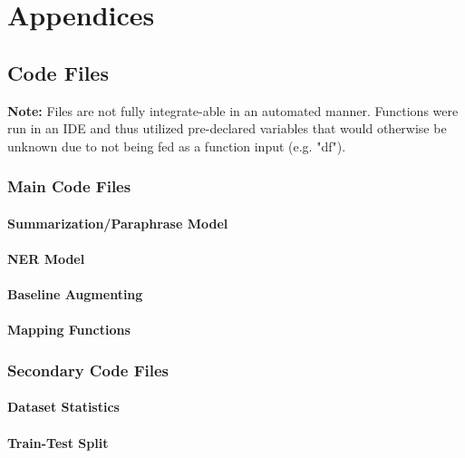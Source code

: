\documentclass[12pt]{report}
\begin{document}
\chapter{Appendices} %
    \section{Code Files}
    \textbf{Note:} Files are not fully integrate-able in an automated manner. Functions were run in an IDE and thus utilized pre-declared variables that would otherwise be unknown due to not being fed as a function input (e.g. "df").
        \subsection{Main Code Files}
            \subsubsection{Summarization/Paraphrase Model}
                
                \newpage
            \subsubsection{NER Model}
                
                \newpage
            \subsubsection{Baseline Augmenting}
                
                \newpage
            \subsubsection{Mapping Functions}
                
                \newpage
            
        \subsection{Secondary Code Files}
            \subsubsection{Dataset Statistics}
                
                \newpage
            \subsubsection{Train-Test Split}
                
        
\end{document}

